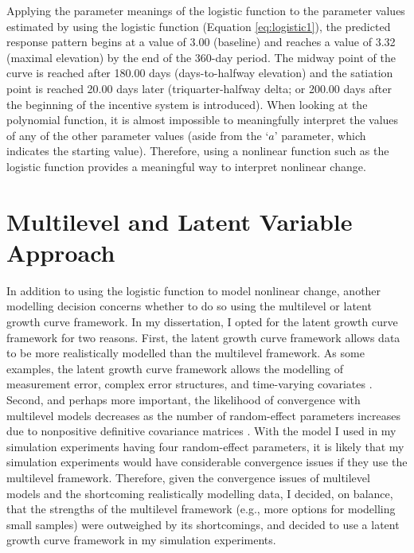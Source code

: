 \documentclass[
12pt, %
twoside,
english]{guelphthesis}
\begin{document}
\noindent Applying the parameter meanings of the logistic function to the parameter values estimated by using the logistic function (Equation \ref{eq:logistic1}), the predicted response pattern begins at a value of 3.00 (baseline) and reaches a value of 3.32 (maximal elevation) by the end of the 360-day period. The midway point of the curve is reached after 180.00 days (days-to-halfway elevation) and the satiation point is reached 20.00 days later (triquarter-halfway delta; or 200.00 days after the beginning of the incentive system is introduced). When looking at the polynomial function, it is almost impossible to meaningfully interpret the values of any of the other parameter values (aside from the `\(a\)' parameter, which indicates the starting value). Therefore, using a nonlinear function such as the logistic function provides a meaningful way to interpret nonlinear change.

\hypertarget{multilevel-and-latent-variable-approach}{%
\section{Multilevel and Latent Variable Approach}\label{multilevel-and-latent-variable-approach}}

In addition to using the logistic function to model nonlinear change, another modelling decision concerns whether to do so using the multilevel or latent growth curve framework. In my dissertation, I opted for the latent growth curve framework for two reasons. First, the latent growth curve framework allows data to be more realistically modelled than the multilevel framework. As some examples, the latent growth curve framework allows the modelling of measurement error, complex error structures, and time-varying covariates \autocite[for a review, see][]{mcneish2018}. Second, and perhaps more important, the likelihood of convergence with multilevel models decreases as the number of random-effect parameters increases due to nonpositive definitive covariance matrices \autocite[for a review, see][]{mcneish2020}. With the model I used in my simulation experiments having four random-effect parameters, it is likely that my simulation experiments would have considerable convergence issues if they use the multilevel framework. Therefore, given the convergence issues of multilevel models and the shortcoming realistically modelling data, I decided, on balance, that the strengths of the multilevel framework (e.g., more options for modelling small samples) were outweighed by its shortcomings, and decided to use a latent growth curve framework in my simulation experiments.
\end{document}
